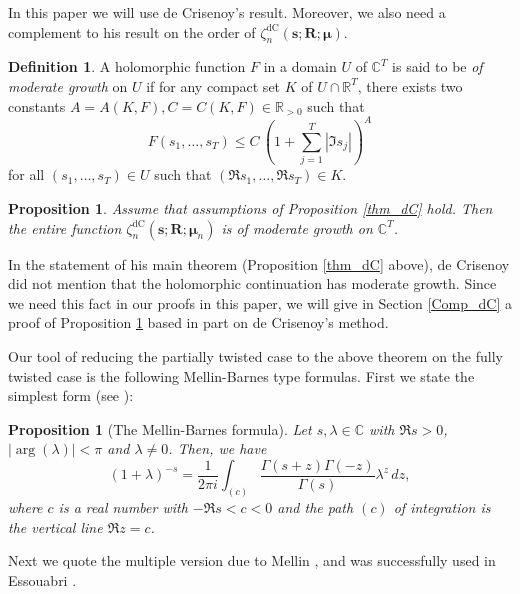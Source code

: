 \documentclass[a4paper,12pt]{article}
\newtheorem{prop}[thm]{Proposition}
\theoremstyle{definition}
\newtheorem{definition}[thm]{Definition}
\numberwithin{equation}{section}
\def\R{{\mathbb R}}
\def\C{{\mathbb C}}
\newcommand{\dc}{\mathrm{dC}}
\newcommand{\dd}{d}
\newcommand{\ii}{i}
\begin{document}
In this paper we will use de Crisenoy's result. Moreover, we also need a complement to his result on the order of $\zeta_{n}^{\dc}(\mathbf{s};\mathbf{R};\boldsymbol{\mu})$.

\begin{definition}\label{moderategrowth}
A holomorphic function $F$ in a domain $U$ of $\C^T$ is said to be {\it of moderate growth} on $U$ if for any compact set $K$ of $U\cap \R^T$, there exists two constants $A=A(K,F), C=C(K,F) \in \R_{>0}$ such that 
$$F(s_1,\ldots, s_T) \leq C \, \left(1+\sum_{j=1}^T |\Im s_j|\right)^A$$
for all $(s_1,\ldots, s_T) \in U$ such that $\left(\Re s_1,\ldots, \Re s_T\right) \in K$.
\end{definition}

\begin{prop}\label{thm_dC_compl}
Assume that assumptions of Proposition \ref{thm_dC} hold. Then the entire function $\zeta_{n}^{\dc}(\mathbf{s};\mathbf{R};\boldsymbol{\mu}_n)$ is of moderate growth on $\C^T$.
\end{prop}

In the statement of his main theorem (Proposition \ref{thm_dC} above), de Crisenoy did not mention that the holomorphic continuation has moderate growth. Since we need this fact in our proofs in this paper, we will give in Section \ref{Comp_dC} a proof of Proposition \ref{thm_dC_compl} based in part on de Crisenoy's method.

Our tool of reducing the partially twisted case to the above theorem on the fully twisted
case is the following Mellin-Barnes type formulas.   First we state the simplest 
form (see \cite[Section 14.51]{WW}):

\begin{prop}
[The Mellin-Barnes formula]
\label{MB_formula}
Let $s,\lambda \in \C$ with $\Re s>0$, $|\arg (\lambda)|<\pi$ and $\lambda \neq 0$. Then, we have 
$$(1+\lambda)^{-s}=\frac{1}{2\pi \ii} \int_{(c)}\frac{\Gamma (s+z) \Gamma (-z)}{\Gamma (s)}\lambda^z \, \dd z,$$
where $c$ is a real number with $-\Re s < c < 0$ and the path $(c)$ of integration is the vertical line $\Re z=c$.
\end{prop}

Next we quote the multiple version due to Mellin \cite{Mell}, and
was successfully used in Essouabri \cite{Esso12}.
\end{document}
